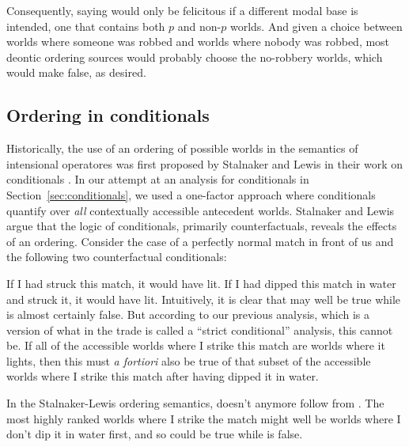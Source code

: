 Consequently, saying \Last would only be felicitous if a different modal base
is intended, one that contains both $p$ and non-$p$ worlds. And given a
choice between worlds where someone was robbed and worlds where nobody was
robbed, most deontic ordering sources would probably choose the no-robbery
worlds, which would make \Last false, as desired.

\subsection{Ordering in conditionals}
\label{subsec:ordering-conditionals}

%
Historically, the use of an ordering of possible worlds in the semantics of
intensional operatores was first proposed by Stalnaker and Lewis in their work
on conditionals \parencite{stalnaker-1968-theory,lewis-1973-counterfactuals}. In
our attempt at an analysis for conditionals in Section~\ref{sec:conditionals},
we used a one-factor approach where conditionals quantify over \emph{all}
contextually accessible antecedent worlds. Stalnaker and Lewis argue that the
logic of conditionals, primarily counterfactuals, reveals the effects of an
ordering. %
%
Consider the case of a perfectly normal match in front of us and the following
two counterfactual conditionals:

\pex
\a If I had struck this match, it would have lit.
\a If I had dipped this match in water and struck it, it would have lit.
\xe
%
Intuitively, it is clear that \Last[a] may well be true while \Last[b] is almost
certainly false. But according to our previous analysis, which is a version of
what in the trade is called a ``strict conditional'' analysis, this cannot be.
If all of the accessible worlds where I strike this match are worlds where it
lights, then this must \emph{a fortiori} also be true of that subset of the
accessible worlds where I strike this match after having dipped it in water.

In the Stalnaker-Lewis ordering semantics, \Last[b] doesn't anymore follow from
\Last[a]. The most highly ranked worlds where I strike the match might well be
worlds where I don't dip it in water first, and so \Last[a] could be true while
\Last[b] is false.

